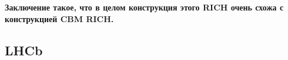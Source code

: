 

\textbf{Заключение такое, что в целом конструкция этого RICH очень схожа с конструкцией CBM RICH.}


\subsection{LHCb}\label{sec:LHCb}


